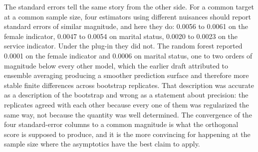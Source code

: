 \documentclass[12pt,a4paper]{article}
\numberwithin{equation}{section}
\theoremstyle{plain}
\theoremstyle{definition}
\begin{document}
	The standard errors tell the same story from the other side. For a common target at a common sample size, four estimators using different nuisances should report standard errors of similar magnitude, and here they do: 0.0056 to 0.0061 on the female indicator, 0.0047 to 0.0054 on marital status, 0.0020 to 0.0023 on the service indicator. Under the plug-in they did not. The random forest reported 0.0001 on the female indicator and 0.0006 on marital status, one to two orders of magnitude below every other model, which the earlier draft attributed to ensemble averaging producing a smoother prediction surface and therefore more stable finite differences across bootstrap replicates. That description was accurate as a description of the bootstrap and wrong as a statement about precision: the replicates agreed with each other because every one of them was regularized the same way, not because the quantity was well determined. The convergence of the four standard-error columns to a common magnitude is what the orthogonal score is supposed to produce, and it is the more convincing for happening at the sample size where the asymptotics have the best claim to apply.
	
\end{document}
